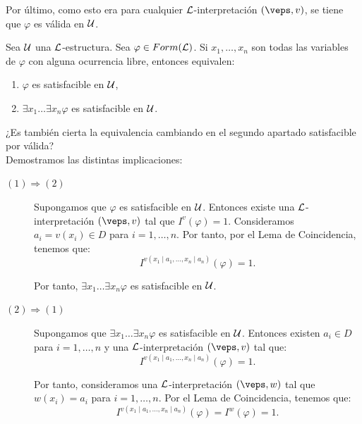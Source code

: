 \begin{ejercicio}
\begin{description}
        Por último, como esto era para cualquier $\mathcal{L}$-interpretación $(\veps,v)$, se tiene que $\varphi$ es válida en $\mathcal{U}$.
    \end{description}
\end{ejercicio}


\begin{ejercicio}\label{ej:2.5}
    Sea $\mathcal{U}$ una $\mathcal{L}$-estructura. Sea $\varphi \in Form(\mathcal{L})$. Si $x_1, \ldots, x_n$ son todas las variables de $\varphi$ con alguna ocurrencia libre, entonces equivalen:
    \begin{enumerate}
        \item $\varphi$ es satisfacible en $\mathcal{U}$,
        \item $\exists x_1 \ldots \exists x_n \varphi$ es satisfacible en $\mathcal{U}$.
    \end{enumerate}
    ¿Es también cierta la equivalencia cambiando en el segundo apartado satisfacible por válida?\\

    Demostramos las distintas implicaciones:
    \begin{description}
        \item[$(1)\Longrightarrow(2)$] Supongamos que $\varphi$ es satisfacible en $\mathcal{U}$. Entonces existe una $\mathcal{L}$-interpretación $(\veps,v)$ tal que $I^v(\varphi) = 1$. Consideramos $a_i=v(x_i)\in D$ para $i=1,\ldots,n$. Por tanto, por el Lema de Coincidencia, tenemos que:
        \begin{equation*}
            I^{v(x_1\mid a_1,\ldots,x_n\mid a_n)}(\varphi) = 1.
        \end{equation*}

        Por tanto, $\exists x_1 \ldots \exists x_n \varphi$ es satisfacible en $\mathcal{U}$.

        \item[$(2)\Longrightarrow(1)$] Supongamos que $\exists x_1 \ldots \exists x_n \varphi$ es satisfacible en $\mathcal{U}$. Entonces existen $a_i\in D$ para $i=1,\ldots,n$ y una $\mathcal{L}$-interpretación $(\veps,v)$ tal que:
        \begin{equation*}
            I^{v(x_1\mid a_1,\ldots,x_n\mid a_n)}(\varphi) = 1.
        \end{equation*}

        Por tanto, consideramos una $\mathcal{L}$-interpretación $(\veps,w)$ tal que $w(x_i) = a_i$ para $i=1,\ldots,n$. Por el Lema de Coincidencia, tenemos que:
        \begin{equation*}
            I^{v(x_1\mid a_1,\ldots,x_n\mid a_n)}(\varphi) = I^w(\varphi) = 1.
        \end{equation*}


\end{description}
\end{ejercicio}
